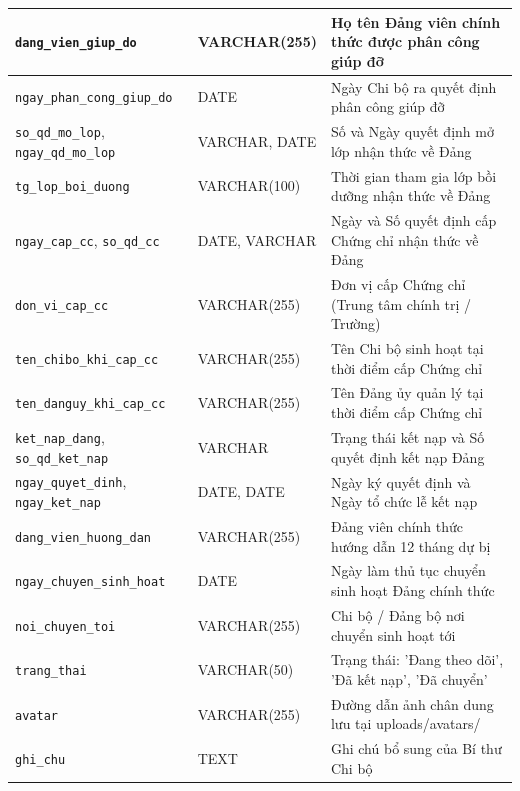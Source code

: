 \documentclass[12pt,a4paper]{report}
\begin{document}
{\begin{xltabular}{\linewidth}{|>{\raggedright\arraybackslash}p{4.8cm}|>{\raggedright\arraybackslash}p{2.8cm}|>{\raggedright\arraybackslash}X|}
    \texttt{dang\_vien\_giup\_do}                        & VARCHAR(255)  & Họ tên Đảng viên chính thức được phân công giúp đỡ             \\ \hline
    \texttt{ngay\_phan\_cong\_giup\_do}                  & DATE          & Ngày Chi bộ ra quyết định phân công giúp đỡ                    \\ \hline
    \texttt{so\_qd\_mo\_lop}, \texttt{ngay\_qd\_mo\_lop} & VARCHAR, DATE & Số và Ngày quyết định mở lớp nhận thức về Đảng                 \\ \hline
    \texttt{tg\_lop\_boi\_duong}                         & VARCHAR(100)  & Thời gian tham gia lớp bồi dưỡng nhận thức về Đảng             \\ \hline
    \texttt{ngay\_cap\_cc}, \texttt{so\_qd\_cc}          & DATE, VARCHAR & Ngày và Số quyết định cấp Chứng chỉ nhận thức về Đảng          \\ \hline
    \texttt{don\_vi\_cap\_cc}                            & VARCHAR(255)  & Đơn vị cấp Chứng chỉ (Trung tâm chính trị / Trường)            \\ \hline
    \texttt{ten\_chibo\_khi\_cap\_cc}                    & VARCHAR(255)  & Tên Chi bộ sinh hoạt tại thời điểm cấp Chứng chỉ               \\ \hline
    \texttt{ten\_danguy\_khi\_cap\_cc}                   & VARCHAR(255)  & Tên Đảng ủy quản lý tại thời điểm cấp Chứng chỉ                \\ \hline
    \texttt{ket\_nap\_dang}, \texttt{so\_qd\_ket\_nap}   & VARCHAR       & Trạng thái kết nạp và Số quyết định kết nạp Đảng               \\ \hline
    \texttt{ngay\_quyet\_dinh}, \texttt{ngay\_ket\_nap}  & DATE, DATE    & Ngày ký quyết định và Ngày tổ chức lễ kết nạp                  \\ \hline
    \texttt{dang\_vien\_huong\_dan}                      & VARCHAR(255)  & Đảng viên chính thức hướng dẫn 12 tháng dự bị                  \\ \hline
    \texttt{ngay\_chuyen\_sinh\_hoat}                    & DATE          & Ngày làm thủ tục chuyển sinh hoạt Đảng chính thức              \\ \hline
    \texttt{noi\_chuyen\_toi}                            & VARCHAR(255)  & Chi bộ / Đảng bộ nơi chuyển sinh hoạt tới                      \\ \hline
    \texttt{trang\_thai}                                 & VARCHAR(50)   & Trạng thái: 'Đang theo dõi', 'Đã kết nạp', 'Đã chuyển'         \\ \hline
    \texttt{avatar}                                      & VARCHAR(255)  & Đường dẫn ảnh chân dung lưu tại uploads/avatars/               \\ \hline
    \texttt{ghi\_chu}                                    & TEXT          & Ghi chú bổ sung của Bí thư Chi bộ                              \\ \hline
  \end{xltabular}}
\end{document}
